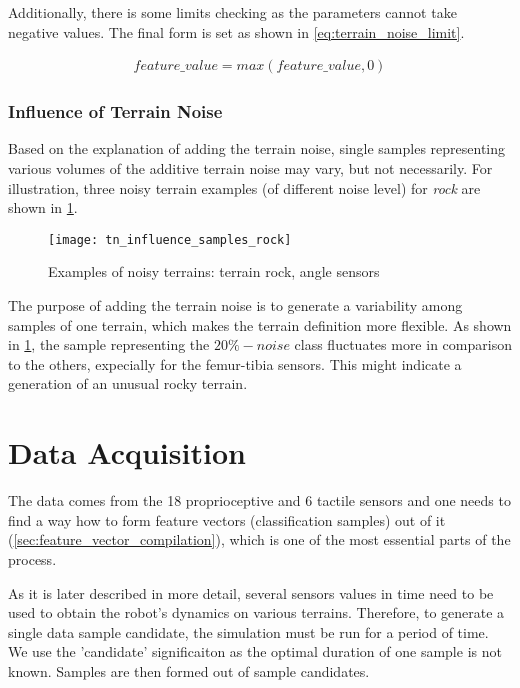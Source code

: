 Additionally, there is some limits checking as the parameters cannot take negative values. The final form is set as shown in \cref{eq:terrain_noise_limit}.

\begin{align} \label{eq:terrain_noise_limit}
feature\_value = max(feature\_value, 0)
\end{align}

\subsubsection*{Influence of Terrain Noise} \label{sssec:terrain_noise_influence}
Based on the explanation of adding the terrain noise, single samples representing various volumes of the additive terrain noise may vary, but not necessarily. For illustration, three noisy terrain examples (of different noise level) for \textit{rock} are shown in \cref{fig:tn_influence_samples_rock}.

\begin{figure}[H]
  \centering
  \texttt{[image: tn\_influence\_samples\_rock]}
  \caption{Examples of noisy terrains: terrain rock, angle sensors}
  \label{fig:tn_influence_samples_rock}
\end{figure}

The purpose of adding the terrain noise is to generate a variability among samples of one terrain, which makes the terrain definition more flexible. As shown in \cref{fig:tn_influence_samples_rock}, the sample representing the $ 20\%-noise $ class fluctuates more in comparison to the others, expecially for the femur-tibia sensors. This might indicate a generation of an unusual rocky terrain.

\section{Data Acquisition} \label{sec:data_acquisition}
The data comes from the 18 proprioceptive and 6 tactile sensors and one needs to find a way how to form feature vectors (classification samples) out of it (\cref{sec:feature_vector_compilation}), which is one of the most essential parts of the process.

As it is later described in more detail, several sensors values in time need to be used to obtain the robot's dynamics on various terrains. Therefore, to generate a single data sample candidate, the simulation must be run for a period of time. We use the 'candidate' significaiton as the optimal duration of one sample is not known. Samples are then formed out of sample candidates.

